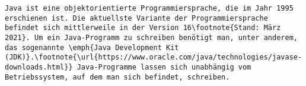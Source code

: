 \begin{verbatim}
Java ist eine objektorientierte Programmiersprache, die im Jahr 1995 erschienen ist. Die aktuellste Variante der Programmiersprache befindet sich mittlerweile in der Version 16\footnote{Stand: März 2021}. Um ein Java-Programm zu schreiben benötigt man, unter anderem, das sogenannte \emph{Java Development Kit (JDK)}.\footnote{\url{https://www.oracle.com/java/technologies/javase-downloads.html}} Java-Programme lassen sich unabhängig vom Betriebssystem, auf dem man sich befindet, schreiben.
\end{verbatim}

	
